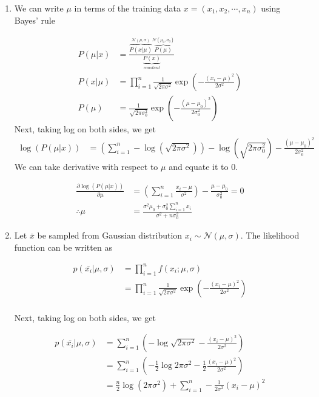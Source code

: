 \begin{enumerate}
	\item We can write $\mu$ in terms of the training data $x = (x_{1}, x_{2}, \cdots, x_{n})$ using Bayes' rule

		\begin{align*}
		    P(\mu | x) & = \frac{\overbrace{P(x | \mu)}^{\mathcal{N(\mu, \sigma)}}\overbrace{P(\mu)}^{\mathcal{N}(\mu_{0}, \sigma_{0})}}{\underbrace{P(x)}_{constant}} \\
		    P(x | \mu) & = \prod_{i=1}^{n} \frac{1}{\sqrt{2\pi\sigma^{2}}} \exp\left( - \frac{(x_{i} - \mu)^{2}}{2\sigma^{2}} \right) \\
		    P(\mu) & = \frac{1}{\sqrt{2\pi\sigma_{0}^{2}}}\exp{ \left( -\frac{(\mu - \mu_{0})^{2}}{2\sigma_{0}^{2}} \right) }
		\end{align*}
		Next, taking log on both sides, we get
		\begin{align*}
		    \log(P(\mu | x)) & = \left( \sum_{i=1}^{n} -\log \left( \sqrt{2\pi\sigma^{2}} \right) \right) - \log \left( \sqrt{2\pi\sigma_{0}^{2}} \right) - \frac{(\mu - \mu_{0})^{2}}{2\sigma_{0}^{2}}
		\end{align*}
		We can take derivative with respect to $\mu$ and equate it to 0.

		\begin{align*}
		    \frac{\partial\log(P(\mu|x))}{\partial\mu} & = \left( \sum_{i=1}^{n} \frac{x_{i} - \mu}{\sigma^{2}} \right) - \frac{\mu - \mu_{0}}{\sigma_{0}^{2}} = 0 \\
		    \therefore \mu & = \frac{\sigma^{2}\mu_{0} + \sigma_{0}^{2}\sum_{i=1}^{n}x_{i}}{\sigma^{2} + n\sigma_{0}^{2}}
		\end{align*}
		
	
	\item Let $\bar{x}$ be sampled from Gaussian distribution $x_{i} \sim \mathcal{N}(\mu, \sigma)$. The likelihood function can be written as

		\begin{align*}
		    p(\bar{x_{i}} | \mu, \sigma) & = \prod_{i=1}^{n}f(x_{i}; \mu, \sigma) \\
 		   & = \prod_{i=1}^{n} \frac{1}{\sqrt{2\pi\sigma^{2}}} \exp\left( - \frac{(x_{i} - \mu)^{2}}{2\sigma^{2}} \right) \\    
		\end{align*}

		Next, taking log on both sides, we get

		\begin{align*}
		    p(\bar{x_{i}} | \mu, \sigma) & = \sum_{i=1}^{n} \left( - \log{\sqrt{2\pi\sigma^{2}}} - \frac{(x_{i} - \mu)^{2}}{2\sigma^{2}} \right) \\
		    & = \sum_{i=1}^{n} \left( - \frac{1}{2} \log{2\pi\sigma^{2}} - \frac{1}{2} \frac{(x_{i} - \mu)^{2}}{2\sigma^{2}} \right) \\
		    & = \frac{n}{2} \log(2\pi\sigma^{2}) + \sum_{i=1}^{n} -\frac{1}{2\sigma^{2}} (x_{i} - \mu)^{2} \\
		\end{align*}


\end{enumerate}
